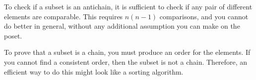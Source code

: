 
\begin{hint}
	To check if a subset is an antichain, it is sufficient to check if any pair of different elements are comparable.
	This requires $n(n-1)$ comparisons, and you cannot do better in general, without any additional assumption you can make on the poset.
\end{hint}

\begin{hint}
	To prove that a subset is a chain, you must produce an order for the elements.
	If you cannot find a consistent order, then the subset is not a chain.
	Therefore, an efficient way to do this might look like a sorting algorithm.
\end{hint}
